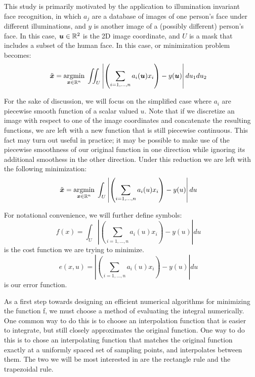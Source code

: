 \documentclass[12pt,journal,draftcls,letterpaper,onecolumn]{IEEEtran}
\begin{document}
This study is primarily motivated by the application to illumination invariant face recognition, in which $a_j$ are a database of images of one person's face under different illuminations, and $y$ is another image of a (possibly different) person's face.  In this case, $\boldsymbol{u} \in \mathbb R^2$ is the 2D image coordinate, and $U$ is a mask that includes a subset of the human face.  In this case, or minimization problem becomes:
\begin{equation}\label{eqn:continuous2D}
\tilde{{\boldsymbol{x}}} = {\hbox{$\underset{{\boldsymbol{x}}\in \mathbb R^n}{\mbox{argmin}}\;$}} \iint_U{\left|\left(\sum_{i=1,\ldots,n} a_i(\boldsymbol{u}) x_i\right) - y(\boldsymbol{u})\right| du_1 du_2}
\end{equation}

For the sake of discussion, we will focus on the simplified case where $a_i$ are piecewise smooth function of a scalar valued $u$.  Note that if we discretize an image with respect to one of the image coordinates and concatenate the resulting functions, we are left with a new function that is still piecewise continuous.  This fact may turn out useful in practice; it may be possible to make use of the piecewise smoothness of our original function in one direction while ignoring its additional smoothess in the other direction.  Under this reduction we are left with the following minimization:
\begin{equation}\label{eqn:continuous1D}
\tilde{{\boldsymbol{x}}} = {\hbox{$\underset{{\boldsymbol{x}}\in \mathbb R^n}{\mbox{argmin}}\;$}} \int_U{ \left|\left(\sum_{i=1,\ldots,n} a_i(u) x_i\right) - y(u)\right| du}
\end{equation}

For notational convenience, we will further define symbols:
\begin{equation}
 f(x) = \int_U{ \left|\left(\sum_{i=1,\ldots,n} a_i(u) x_i\right) - y(u)\right| du}
\end{equation}
is the cost function we are trying to minimize.
\begin{equation}
 e(x,u) = \left|\left(\sum_{i=1,\ldots,n} a_i(u) x_i\right) - y(u)\right| du
\end{equation}
is our error function.

As a first step towards designing an efficient numerical algorithms for minimizing the function f, we must choose a method of evaluating the integral numerically.  One common way to do this is to choose an interpolation function that is easier to integrate, but still closely approximates the original function.  One way to do this is to chose an interpolating function that matches the original function exactly at a uniformly spaced set of sampling points, and interpolates between them.  The two we will be most interested in are the rectangle rule and the trapezoidal rule.
\end{document}
